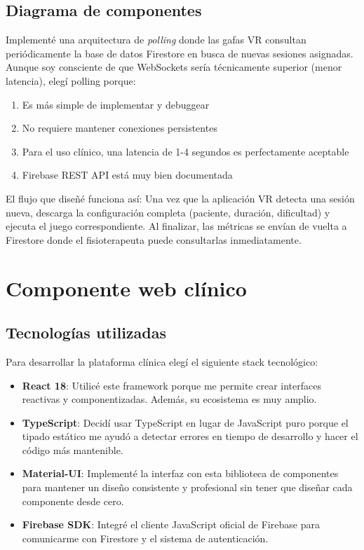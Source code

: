 \subsection{Diagrama de componentes}

Implementé una arquitectura de \textit{polling} donde las gafas VR consultan periódicamente la base de datos Firestore en busca de nuevas sesiones asignadas. Aunque soy consciente de que WebSockets sería técnicamente superior (menor latencia), elegí polling porque:

\begin{enumerate}
    \item Es más simple de implementar y debuggear
    \item No requiere mantener conexiones persistentes
    \item Para el uso clínico, una latencia de 1-4 segundos es perfectamente aceptable
    \item Firebase REST API está muy bien documentada
\end{enumerate}

El flujo que diseñé funciona así: Una vez que la aplicación VR detecta una sesión nueva, descarga la configuración completa (paciente, duración, dificultad) y ejecuta el juego correspondiente. Al finalizar, las métricas se envían de vuelta a Firestore donde el fisioterapeuta puede consultarlas inmediatamente.

\section{Componente web clínico}

\subsection{Tecnologías utilizadas}

Para desarrollar la plataforma clínica elegí el siguiente stack tecnológico:

\begin{itemize}
    \item \textbf{React 18}: Utilicé este framework porque me permite crear interfaces reactivas y componentizadas. Además, su ecosistema es muy amplio.
    
    \item \textbf{TypeScript}: Decidí usar TypeScript en lugar de JavaScript puro porque el tipado estático me ayudó a detectar errores en tiempo de desarrollo y hacer el código más mantenible.
    
    \item \textbf{Material-UI}: Implementé la interfaz con esta biblioteca de componentes para mantener un diseño consistente y profesional sin tener que diseñar cada componente desde cero.
    
    \item \textbf{Firebase SDK}: Integré el cliente JavaScript oficial de Firebase para comunicarme con Firestore y el sistema de autenticación.
\end{itemize}

